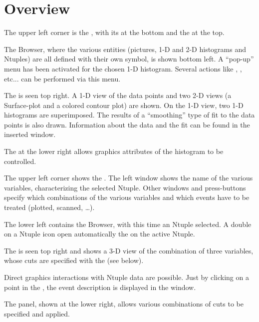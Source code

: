 \clearpage
\mbox{}
\clearpage

\section{Overview}


\begin{UL}
\item The upper left corner is the \PAWPP{} \EW, with its \IP{}
      at the bottom and the \TP{} at the top.
\item The \PAWPP{} Browser, where the various entities (pictures, 1-D and
      2-D histograms and Ntuples) are all defined with their own symbol,
      is shown bottom left.  A ``pop-up'' menu has been activated for the 
      chosen 1-D histogram. Several actions like , ,
       etc... can be performed via this menu.
\item The \GW{} is seen top right. 
      A 1-D view of the data points and two 2-D views (a Surface-plot and a 
      colored contour plot) are shown.
      On the 1-D view, two 1-D histograms are 
      superimposed. The results of a ``smoothing'' type of fit to the data 
      points is also drawn. Information about the data and the fit can be found
      in the inserted window.
\item The \HSP{} at the lower right allows graphics
      attributes of the histogram to be controlled.
\end{UL}


\begin{UL}
\item The upper left corner shows the \NV.
      The left window shows the name of the various variables, characterizing
      the selected Ntuple. Other windows and press-buttons specify which
      combinations of the various variables and which events
      have to be treated (plotted, scanned, \ldots).
\item The lower left contains the \PAWPP{} Browser, with this time an Ntuple
      selected. A double on a Ntuple icon
      open automatically the \NV{} on the active Ntuple.
\item The \GW{} is seen top right and shows a 3-D view
      of the combination of three variables, whose cuts are
      specified with the \CE{} (see below).
\item Direct graphics interactions with Ntuple data are possible. Just
      by clicking on a point in the  \GW, the event description is displayed
      in the \PL{} window.
\item The \CE{} panel, shown at the lower right, allows
      various combinations of cuts to be specified and applied.
\end{UL}

